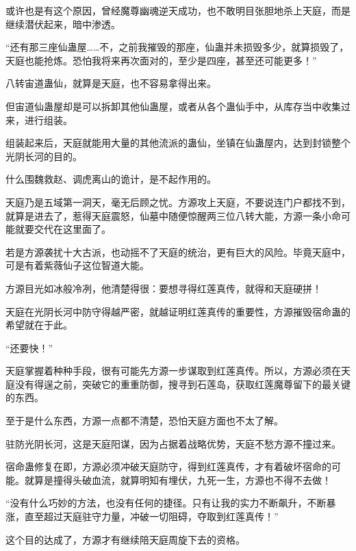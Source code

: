 \begin{this_body}
或许也是有这个原因，曾经魔尊幽魂逆天成功，也不敢明目张胆地杀上天庭，而是继续潜伏起来，暗中渗透。

“还有那三座仙蛊屋……不，之前我摧毁的那座，仙蛊并未损毁多少，就算损毁了，天庭也能抢炼。恐怕我将来再次面对的，至少是四座，甚至还可能更多！”

八转宙道蛊仙，就算是天庭，也不容易拿得出来。

但宙道仙蛊屋却是可以拆卸其他仙蛊屋，或者从各个蛊仙手中，从库存当中收集过来，进行组装。

组装起来后，天庭就能用大量的其他流派的蛊仙，坐镇在仙蛊屋内，达到封锁整个光阴长河的目的。

什么围魏救赵、调虎离山的诡计，是不起作用的。

天庭乃是五域第一洞天，毫无后顾之忧。方源攻上天庭，不要说连门户都找不到，就算是进去了，惹得天庭震怒，仙墓中随便惊醒两三位八转大能，方源一条小命可能就要交代在这里面了。

若是方源袭扰十大古派，也动摇不了天庭的统治，更有巨大的风险。毕竟天庭中，可是有着紫薇仙子这位智道大能。

方源目光如冰般冷冽，他清楚得很：要想寻得红莲真传，就得和天庭硬拼！

天庭在光阴长河中防守得越严密，就越证明红莲真传的重要性，方源摧毁宿命蛊的希望就在于此。

“还要快！”

天庭掌握着种种手段，很有可能先方源一步谋取到红莲真传。所以，方源必须在天庭没有得逞之前，突破它的重重防御，搜寻到石莲岛，获取红莲魔尊留下的最关键的东西。

至于是什么东西，方源一点都不清楚，恐怕天庭方面也不太了解。

驻防光阴长河，这是天庭阳谋，因为占据着战略优势，天庭不愁方源不撞过来。

宿命蛊修复在即，方源必须冲破天庭防守，得到红莲真传，才有着破坏宿命的可能。就算是撞得头破血流，就算明知有埋伏，九死一生，方源也不得不去做！

“没有什么巧妙的方法，也没有任何的捷径。只有让我的实力不断飙升，不断暴涨，直至超过天庭驻守力量，冲破一切阻碍，夺取到红莲真传！”

这个目的达成了，方源才有继续陪天庭周旋下去的资格。

\end{this_body}

